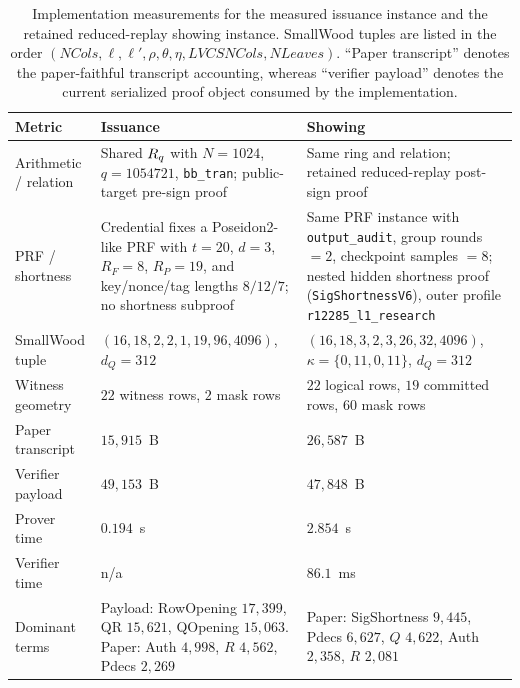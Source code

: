 \begin{table}[t]
\centering
\footnotesize
\setlength{\tabcolsep}{4pt}
\renewcommand{\arraystretch}{1.08}
\begin{tabular}{@{}p{}p{}p{}@{}}
\toprule
\textbf{Metric} & \textbf{Issuance} & \textbf{Showing} \\
\midrule
Arithmetic / relation &
Shared \(R_q\) with \(N=1024\), \(q=1054721\), \texttt{bb\_tran}; public-target pre-sign proof &
Same ring and relation; retained reduced-replay post-sign proof \\

PRF / shortness &
Credential fixes a Poseidon2-like PRF with \(t=20\), \(d=3\), \(R_F=8\), \(R_P=19\), and key/nonce/tag lengths \(8/12/7\); no shortness subproof &
Same PRF instance with \texttt{output\_audit}, group rounds \(=2\), checkpoint samples \(=8\); nested hidden shortness proof (\texttt{SigShortnessV6}), outer profile \texttt{r12285\_l1\_research} \\

SmallWood tuple &
\((16,18,2,2,1,19,96,4096)\), \(d_Q=312\) &
\((16,18,3,2,3,26,32,4096)\), \(\kappa=\{0,11,0,11\}\), \(d_Q=312\) \\

Witness geometry &
\(22\) witness rows, \(2\) mask rows &
\(22\) logical rows, \(19\) committed rows, \(60\) mask rows \\

Paper transcript &
\(15{,}915\)~B &
\(26{,}587\)~B \\

Verifier payload &
\(49{,}153\)~B &
\(47{,}848\)~B \\

Prover time &
\(0.194\)~s &
\(2.854\)~s \\

Verifier time &
n/a &
\(86.1\)~ms \\

Dominant terms &
Payload: RowOpening \(17{,}399\), QR \(15{,}621\), QOpening \(15{,}063\). Paper: Auth \(4{,}998\), \(R\) \(4{,}562\), Pdecs \(2{,}269\) &
Paper: SigShortness \(9{,}445\), Pdecs \(6{,}627\), \(Q\) \(4{,}622\), Auth \(2{,}358\), \(R\) \(2{,}081\) \\
\bottomrule
\end{tabular}
\caption{Implementation measurements for the measured issuance instance and the retained reduced-replay showing instance.
SmallWood tuples are listed in the order \((NCols,\ell,\ell',\rho,\theta,\eta,LVCSNCols,NLeaves)\).
``Paper transcript'' denotes the paper-faithful transcript accounting, whereas ``verifier payload'' denotes the current
serialized proof object consumed by the implementation.}
\label{tab:implementation-results}
\end{table}

